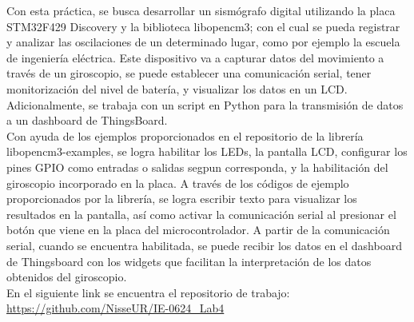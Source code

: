

Con esta práctica, se busca desarrollar un sismógrafo digital utilizando la placa STM32F429 Discovery y la biblioteca libopencm3; con el cual se pueda registrar y analizar las oscilaciones de un determinado lugar, como por ejemplo la escuela de ingeniería eléctrica. Este dispositivo va a capturar datos del movimiento a través de un giroscopio, se puede establecer una comunicación serial, tener monitorización del nivel de batería, y visualizar los datos en un LCD. Adicionalmente, se trabaja con un script en Python para la transmisión de datos a un dashboard de ThingsBoard. \\

Con ayuda de los ejemplos proporcionados en el repositorio de la librería libopencm3-examples, se logra habilitar los LEDs, la pantalla LCD, configurar los pines GPIO como entradas o salidas segpun corresponda, y la habilitación del giroscopio incorporado en la placa. A través de los códigos de ejemplo proporcionados por la librería, se logra escribir texto para visualizar los resultados en la pantalla, así como activar la comunicación serial al presionar el botón que viene en la placa del microcontrolador. A partir de la comunicación serial, cuando se encuentra habilitada, se puede recibir los datos en el dashboard de Thingsboard con los widgets que facilitan la interpretación de los datos obtenidos del giroscopio.  \\

En el siguiente link se encuentra el repositorio de trabajo: \url{https://github.com/NisseUR/IE-0624_Lab4}

